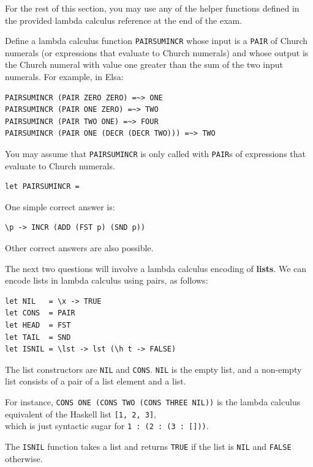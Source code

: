 \documentclass[addpoints]{exam}
\begin{document}
\begin{questions}
For the rest of this section, you may use any of the helper functions defined in the provided lambda calculus reference at the end of the exam.

\question[7] Define a lambda calculus function \texttt{PAIRSUMINCR} whose input is a \texttt{PAIR} of Church numerals (or expressions that evaluate to Church numerals) and whose output is the Church numeral with value one greater than the sum of the two input numerals.  For example, in Elsa:

\begin{verbatim}
PAIRSUMINCR (PAIR ZERO ZERO) =~> ONE
PAIRSUMINCR (PAIR ONE ZERO) =~> TWO
PAIRSUMINCR (PAIR TWO ONE) =~> FOUR
PAIRSUMINCR (PAIR ONE (DECR (DECR TWO))) =~> TWO
\end{verbatim}

You may assume that \texttt{PAIRSUMINCR} is only called with \texttt{PAIR}s of expressions that evaluate to Church numerals.

\begin{verbatim}
let PAIRSUMINCR = 
\end{verbatim}
\begin{solutionorbox}[2in]
One simple correct answer is:
\begin{verbatim}
\p -> INCR (ADD (FST p) (SND p))
\end{verbatim}
Other correct answers are also possible.
\end{solutionorbox}

\newpage

The next two questions will involve a lambda calculus encoding of \textbf{lists}.  We can encode lists in lambda calculus using pairs, as follows:

\begin{verbatim}
let NIL   = \x -> TRUE
let CONS  = PAIR
let HEAD  = FST
let TAIL  = SND
let ISNIL = \lst -> lst (\h t -> FALSE)
\end{verbatim}

The list constructors are \texttt{NIL} and \texttt{CONS}.  \texttt{NIL} is the empty list, and a non-empty list consists of a pair of a list element and a list.

For instance, \texttt{CONS ONE (CONS TWO (CONS THREE NIL))} is the lambda calculus equivalent of the Haskell list \texttt{[1, 2, 3]},\\
which is just syntactic sugar for \texttt{1 : (2 : (3 : []))}.

The \texttt{ISNIL} function takes a list and returns \texttt{TRUE} if the list is \texttt{NIL} and \texttt{FALSE} otherwise.


\end{questions}
\end{document}
